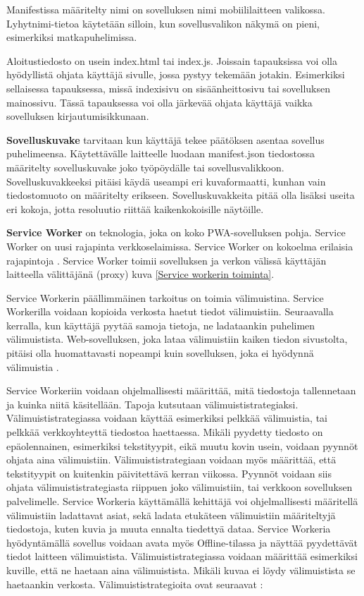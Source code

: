 \documentclass{tktltiki}
\begin{document}
Manifestissa määritelty nimi on sovelluksen nimi mobiililaitteen valikossa. Lyhytnimi-tietoa käytetään silloin, kun sovellusvalikon näkymä on pieni, esimerkiksi matkapuhelimissa.

Aloitustiedosto on usein index.html tai index.js. Joissain tapauksissa voi olla hyödyllistä ohjata käyttäjä sivulle, jossa pystyy tekemään jotakin. Esimerkiksi sellaisessa tapauksessa, missä indexisivu on sisäänheittosivu tai sovelluksen mainossivu. Tässä tapauksessa voi olla järkevää ohjata käyttäjä vaikka sovelluksen kirjautumisikkunaan.

\textbf{Sovelluskuvake} tarvitaan kun käyttäjä tekee päätöksen asentaa sovellus puhelimeensa. Käytettävälle laitteelle luodaan manifest.json tiedostossa määritelty sovelluskuvake joko työpöydälle tai sovellusvalikkoon. Sovelluskuvakkeeksi pitäisi käydä useampi eri kuvaformaatti, kunhan vain tiedostomuoto on määritelty erikseen. Sovelluskuvakkeita pitää olla lisäksi useita eri kokoja, jotta resoluutio riittää kaikenkokoisille näytöille.

\textbf{Service Worker} on teknologia, joka on koko PWA-sovelluksen pohja. Service Worker on uusi rajapinta verkkoselaimissa. Service Worker on kokoelma erilaisia rajapintoja \cite{malavolta2017assessing}. Service Worker toimii sovelluksen ja verkon välissä käyttäjän laitteella välittäjänä (proxy) kuva \ref{Service workerin toiminta}.

Service Workerin päällimmäinen tarkoitus on toimia välimuistina. Service Workerilla voidaan kopioida verkosta haetut tiedot välimuistiin. Seuraavalla kerralla, kun käyttäjä pyytää samoja tietoja, ne ladataankin puhelimen välimuistista. Web-sovelluksen, joka lataa välimuistiin kaiken tiedon sivustolta, pitäisi olla huomattavasti nopeampi kuin sovelluksen, joka ei hyödynnä välimuistia \cite{Walton}.

Service Workeriin voidaan ohjelmallisesti määrittää, mitä tiedostoja tallennetaan ja kuinka niitä käsitellään. Tapoja kutsutaan välimuististrategiaksi. Välimuististrategiassa voidaan käyttää esimerkiksi pelkkää välimuistia, tai pelkkää verkkoyhteyttä tiedostoa haettaessa. Mikäli pyydetty tiedosto on epäolennainen, esimerkiksi tekstityypit, eikä muutu kovin usein, voidaan pyynnöt ohjata aina välimuistiin. Välimuististrategiaan voidaan myös määrittää, että tekstityypit on kuitenkin päivitettävä kerran viikossa. Pyynnöt voidaan siis ohjata välimuististrategiasta riippuen joko välimuistiin, tai verkkoon sovelluksen palvelimelle. Service Workeria käyttämällä kehittäjä voi ohjelmallisesti määritellä välimuistiin ladattavat asiat, sekä ladata etukäteen välimuistiin määriteltyjä tiedostoja, kuten kuvia ja muuta ennalta tiedettyä dataa. Service Workeria hyödyntämällä sovellus voidaan avata myös Offline-tilassa ja näyttää pyydettävät tiedot laitteen välimuistista. Välimuististrategiassa voidaan määrittää esimerkiksi kuville, että ne haetaan aina välimuistista. Mikäli kuvaa ei löydy välimuistista se haetaankin verkosta. Välimuististrategioita ovat seuraavat \cite{Google5}:
\end{document}
